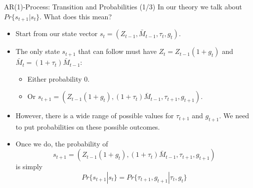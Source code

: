 \documentclass[10pt,c,aspectratio=1610,handout]{beamer}
\begin{document}
\begin{frame}{AR(1)-Process: Transition and Probabilities (1/3)}%
  In our theory we talk about $Pr\{s_{t+1}|s_t\}$. What does this mean?%
  \begin{itemize}%
    \item[$\blacktriangleright$] Start from our state vector $s_{t}=\left( Z_{t-1},\bar{M}_{t-1},\tau _{t},g_{t}\right).$%
    \pause%
    \item[$\blacktriangleright$] The only state $s_{t+1}$ that can follow must have $Z_{t}=Z_{t-1}(1+g_{t})$ and $\bar{M}_{t}=(1+\tau_{t})\bar{M}_{t-1}:$%
    \begin{itemize}%
      \item[$\rightarrow$] Either probability $0$.%
      \item[$\rightarrow$] Or $s_{t+1} = ( Z_{t-1}(1+g_{t}),(1+\tau_{t})\bar{M}_{t-1} ,\tau_{t+1},g_{t+1})$.%
    \end{itemize}%
    \pause%
    \item[$\blacktriangleright$] However, there is a wide range of possible values for $\tau _{t+1} $ and $g_{t+1}$. We need to put probabilities on these possible outcomes.%
    \pause%
    \item[$\blacktriangleright$] Once we do, the probability of \[ s_{t+1} = ( Z_{t-1}(1+g_{t}),(1+\tau_{t})\bar{M}_{t-1} ,\tau _{t+1},g_{t+1}) \] is simply \[ Pr\{s_{t+1}|s_t\} = Pr\{\tau _{t+1},g_{t+1} | \tau _{t},g_{t}\} \]%
  \end{itemize}%
\end{frame}%
\end{document}
